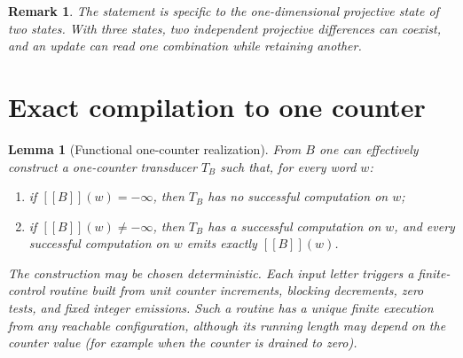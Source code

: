 \documentclass[11pt]{article}
\newtheorem{lemma}[theorem]{Lemma}
\newtheorem{remark}[theorem]{Remark}
\newcommand{\minf}{-\infty}
\newcommand{\eval}[1]{[\![#1]\!]}
\begin{document}
\begin{remark}
The statement is specific to the one-dimensional projective state of two states. With three states, two independent projective differences can coexist, and an update can read one combination while retaining another.
\end{remark}

\section{Exact compilation to one counter}

\begin{lemma}[Functional one-counter realization]\label{lem:counter}
From $B$ one can effectively construct a one-counter transducer $T_B$ such that, for every word $w$:
\begin{enumerate}[label=(\roman*)]
\item if $\eval{B}(w)=\minf$, then $T_B$ has no successful computation on $w$;
\item if $\eval{B}(w)\neq\minf$, then $T_B$ has a successful computation on $w$, and every successful computation on $w$ emits exactly $\eval{B}(w)$.
\end{enumerate}
The construction may be chosen deterministic. Each input letter triggers a finite-control routine built from unit counter increments, blocking decrements, zero tests, and fixed integer emissions. Such a routine has a unique finite execution from any reachable configuration, although its running length may depend on the counter value (for example when the counter is drained to zero).
\end{lemma}
\end{document}
